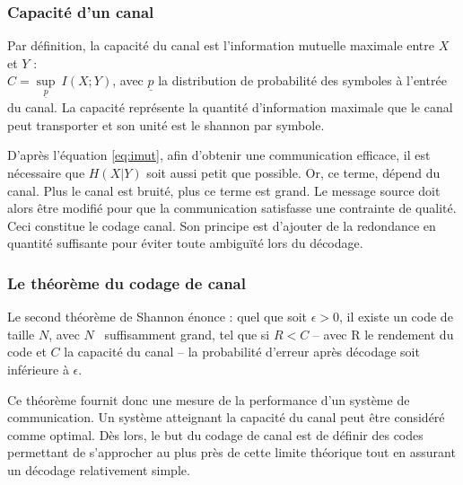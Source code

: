 \subsubsection{Capacité d'un canal}
Par définition, la capacité du canal est l'information mutuelle maximale entre $X$ et $Y$ : \\
$C=\sup\limits_{\underline{p}}\ I(X;Y)$, avec $\underline{p}$ la distribution de probabilité des symboles à l'entrée 
du canal. La capacité représente la quantité d'information maximale que le canal peut transporter et son unité est le 
shannon par symbole.

D'après l'équation \ref{eq:imut}, afin d'obtenir une communication efficace, il est nécessaire que $H(X|Y)$ soit aussi
petit que possible. Or, ce terme, dépend du canal. Plus le canal est bruité, plus ce terme est grand. Le message 
source doit alors être modifié pour que la communication satisfasse une contrainte de qualité. Ceci constitue le codage 
canal. Son principe est d'ajouter de la redondance en quantité suffisante pour éviter toute ambiguïté lors du décodage.

\subsubsection{Le théorème du codage de canal}
Le second théorème de Shannon énonce : quel que soit $\epsilon > 0$, il existe un code de taille $N$, avec $N$ \
suffisamment grand, tel que si $R<C$ -- avec R le rendement du code et $C$ la capacité du canal -- la probabilité
d'erreur après décodage soit inférieure à $\epsilon$. 

Ce théorème fournit donc une mesure de la performance d'un système de communication. Un système atteignant la capacité 
du canal peut être considéré comme optimal. Dès lors, le but du codage de canal est de définir des codes permettant de 
s'approcher au plus près de cette limite théorique tout en assurant un décodage relativement simple.

